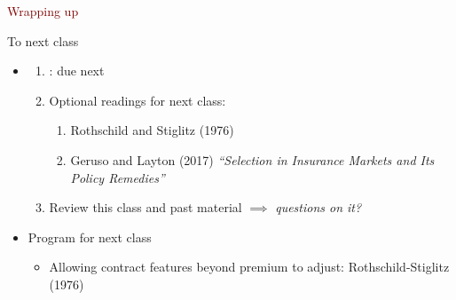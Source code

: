 \begin{frame}{}
    \begin{center}
    \Large \textcolor{maroon}{Wrapping up}
    \end{center}
\end{frame}
\begin{frame}{To next class}
\begin{itemize}
    \item {}
    \begin{enumerate}
        \item {}: due next 
        \item Optional readings for next class:
        \begin{enumerate}
            \item Rothschild and Stiglitz (1976)
            \item Geruso and Layton (2017) \textit{``Selection in Insurance Markets and Its Policy Remedies''}
        \end{enumerate}
        \item Review this class and past material $\implies$ \textit{questions on it?}
    \end{enumerate}
    \vspace{5mm}

    \item Program for next class
    \begin{itemize}
        \item Allowing contract features beyond premium to adjust: Rothschild-Stiglitz (1976)
    \end{itemize}
\end{itemize}
\end{frame}
